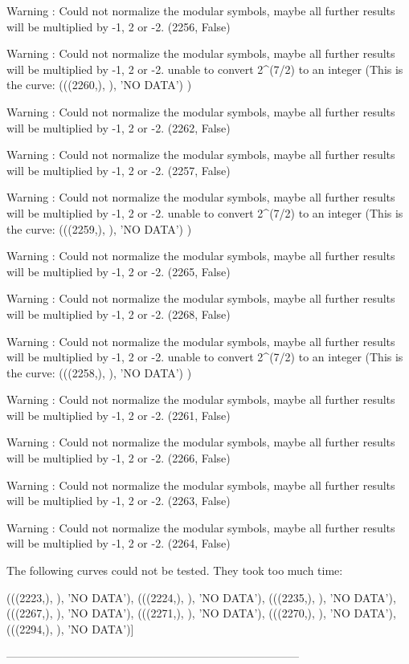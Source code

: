 Warning : Could not normalize the modular symbols, maybe all further results will be multiplied by -1, 2 or -2.
(2256, False)

Warning : Could not normalize the modular symbols, maybe all further results will be multiplied by -1, 2 or -2.
unable to convert 2^(7/2) to an integer (This is the curve:  (((2260,), {}), 'NO DATA') )

Warning : Could not normalize the modular symbols, maybe all further results will be multiplied by -1, 2 or -2.
(2262, False)

Warning : Could not normalize the modular symbols, maybe all further results will be multiplied by -1, 2 or -2.
(2257, False)

Warning : Could not normalize the modular symbols, maybe all further results will be multiplied by -1, 2 or -2.
unable to convert 2^(7/2) to an integer  (This is the curve:  (((2259,), {}), 'NO DATA') )

Warning : Could not normalize the modular symbols, maybe all further results will be multiplied by -1, 2 or -2.
(2265, False)

Warning : Could not normalize the modular symbols, maybe all further results will be multiplied by -1, 2 or -2.
(2268, False)

Warning : Could not normalize the modular symbols, maybe all further results will be multiplied by -1, 2 or -2.
unable to convert 2^(7/2) to an integer  (This is the curve:  (((2258,), {}), 'NO DATA') )

Warning : Could not normalize the modular symbols, maybe all further results will be multiplied by -1, 2 or -2.
(2261, False)

Warning : Could not normalize the modular symbols, maybe all further results will be multiplied by -1, 2 or -2.
(2266, False)

Warning : Could not normalize the modular symbols, maybe all further results will be multiplied by -1, 2 or -2.
(2263, False)

Warning : Could not normalize the modular symbols, maybe all further results will be multiplied by -1, 2 or -2.
(2264, False)

The following curves could not be tested.
They took too much time:

 (((2223,), {}), 'NO DATA'),
 (((2224,), {}), 'NO DATA'),
 (((2235,), {}), 'NO DATA'),
 (((2267,), {}), 'NO DATA'),
 (((2271,), {}), 'NO DATA'),
 (((2270,), {}), 'NO DATA'),
(((2294,), {}), 'NO DATA')]


  ------------------------------------------------------------------------------
  
